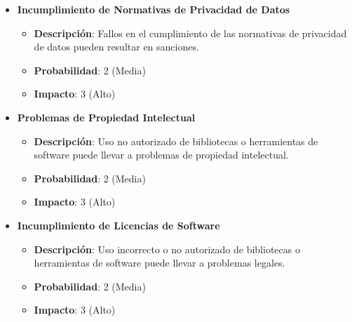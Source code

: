\documentclass{article}
\begin{document}
\begin{itemize}
    \item \textbf{Incumplimiento de Normativas de Privacidad de Datos}
          \begin{itemize}
              \item \textbf{Descripción}: Fallos en el cumplimiento de las normativas de privacidad de datos pueden resultar en sanciones.
              \item \textbf{Probabilidad}: 2 (Media)
              \item \textbf{Impacto}: 3 (Alto)
          \end{itemize}

    \item \textbf{Problemas de Propiedad Intelectual}
          \begin{itemize}
              \item \textbf{Descripción}: Uso no autorizado de bibliotecas o herramientas de software puede llevar a problemas de propiedad intelectual.
              \item \textbf{Probabilidad}: 2 (Media)
              \item \textbf{Impacto}: 3 (Alto)
          \end{itemize}

    \item \textbf{Incumplimiento de Licencias de Software}
          \begin{itemize}
              \item \textbf{Descripción}: Uso incorrecto o no autorizado de bibliotecas o herramientas de software puede llevar a problemas legales.
              \item \textbf{Probabilidad}: 2 (Media)
              \item \textbf{Impacto}: 3 (Alto)
          \end{itemize}
\end{itemize}
\end{document}
